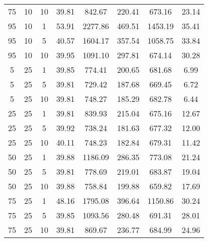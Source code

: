 \begin{table}[h]
\begin{tabular}{ccc|c|c|c|c|c}
75 & 10 & 10 & \cellcolor{gray!50}39.81 & \cellcolor{gray!31}842.67 & \cellcolor{gray!10}220.41 & \cellcolor{gray!46}673.16 & 23.14\\
95 & 10 & 1 & \cellcolor{gray!1}53.91 & \cellcolor{gray!1}2277.86 & \cellcolor{gray!1}469.51 & \cellcolor{gray!1}1453.19 & 35.41\\
95 & 10 & 5 & \cellcolor{gray!43}40.57 & \cellcolor{gray!1}1604.17 & \cellcolor{gray!1}357.54 & \cellcolor{gray!1}1058.75 & 33.84\\
95 & 10 & 10 & \cellcolor{gray!49}39.95 & \cellcolor{gray!1}1091.10 & \cellcolor{gray!1}297.81 & \cellcolor{gray!46}674.14 & 30.28\\
5 & 25 & 1 & \cellcolor{gray!50}39.85 & \cellcolor{gray!42}774.41 & \cellcolor{gray!28}200.65 & \cellcolor{gray!44}681.68 & 6.99\\
5 & 25 & 5 & \cellcolor{gray!50}39.81 & \cellcolor{gray!50}729.42 & \cellcolor{gray!40}187.68 & \cellcolor{gray!48}669.45 & 6.72\\
5 & 25 & 10 & \cellcolor{gray!50}39.81 & \cellcolor{gray!47}748.27 & \cellcolor{gray!42}185.29 & \cellcolor{gray!43}682.78 & 6.44\\
25 & 25 & 1 & \cellcolor{gray!50}39.81 & \cellcolor{gray!31}839.93 & \cellcolor{gray!15}215.04 & \cellcolor{gray!46}675.16 & 12.67\\
25 & 25 & 5 & \cellcolor{gray!49}39.92 & \cellcolor{gray!48}738.24 & \cellcolor{gray!46}181.63 & \cellcolor{gray!45}677.32 & 12.00\\
25 & 25 & 10 & \cellcolor{gray!48}40.11 & \cellcolor{gray!47}748.23 & \cellcolor{gray!45}182.84 & \cellcolor{gray!45}679.31 & 11.42\\
50 & 25 & 1 & \cellcolor{gray!50}39.88 & \cellcolor{gray!1}1186.09 & \cellcolor{gray!1}286.35 & \cellcolor{gray!16}773.08 & 21.24\\
50 & 25 & 5 & \cellcolor{gray!50}39.81 & \cellcolor{gray!42}778.69 & \cellcolor{gray!11}219.01 & \cellcolor{gray!43}683.87 & 19.04\\
50 & 25 & 10 & \cellcolor{gray!50}39.88 & \cellcolor{gray!45}758.84 & \cellcolor{gray!29}199.88 & \cellcolor{gray!50}659.82 & 17.69\\
75 & 25 & 1 & \cellcolor{gray!1}48.16 & \cellcolor{gray!1}1795.08 & \cellcolor{gray!1}396.64 & \cellcolor{gray!1}1150.86 & 30.24\\
75 & 25 & 5 & \cellcolor{gray!50}39.85 & \cellcolor{gray!1}1093.56 & \cellcolor{gray!1}280.48 & \cellcolor{gray!41}691.31 & 28.01\\
75 & 25 & 10 & \cellcolor{gray!50}39.81 & \cellcolor{gray!27}869.67 & \cellcolor{gray!1}236.77 & \cellcolor{gray!43}684.99 & 24.96\\

\end{tabular}
\end{table}
